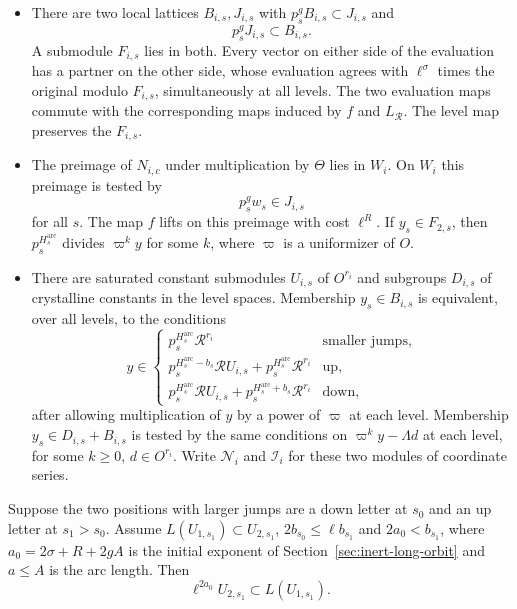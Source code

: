 \begin{itemize}
\item There are two local lattices \(B_{i,s},J_{i,s}\) with
\(p_s^g B_{i,s}\subset J_{i,s}\) and
\[
 p_s^g J_{i,s}\subset B_{i,s}.
\]
A submodule \(F_{i,s}\) lies
in both. Every vector on either side of the evaluation has a partner
on the other side, whose evaluation agrees with \(\ell^\sigma\)
times the original modulo \(F_{i,s}\), simultaneously at all
levels. The two evaluation maps commute with the corresponding
maps induced by \(f\) and \(L_{\mathcal R}\). The level map
preserves the \(F_{i,s}\).
\item The preimage of \(N_{i,c}\) under multiplication by
\(\Theta\) lies in \(W_i\). On \(W_i\) this preimage is tested
by
\[
 p_s^g w_s\in J_{i,s}
\]
for all \(s\).
The map \(f\) lifts on this preimage with cost \(\ell^R\).
If \(y_s\in F_{2,s}\), then \(p_s^{H_s^{\mathrm{arc}}}\) divides
\(\varpi^k y\) for some \(k\), where \(\varpi\) is a
uniformizer of \(O\).
\item There are saturated constant submodules \(U_{i,s}\) of
\(O^{r_i}\) and subgroups \(D_{i,s}\) of crystalline constants
in the level spaces. Membership \(y_s\in B_{i,s}\) is equivalent,
over all levels, to the conditions
\[
 y\in
 \begin{cases}
 p_s^{H_s^{\mathrm{arc}}}\mathcal R^{r_i} &\text{smaller jumps},\\
 p_s^{H_s^{\mathrm{arc}}-b_s}\mathcal R U_{i,s}+p_s^{H_s^{\mathrm{arc}}}\mathcal R^{r_i}
                          &\text{up},\\
 p_s^{H_s^{\mathrm{arc}}}\mathcal R U_{i,s}+p_s^{H_s^{\mathrm{arc}}+b_s}\mathcal R^{r_i}
                          &\text{down},
 \end{cases}
 \tag{\(*\)}\label{eq:wach-level-condition}
\]
after allowing multiplication of \(y\) by a power of \(\varpi\)
at each level. Membership \(y_s\in D_{i,s}+B_{i,s}\) is tested
by the same conditions on \(\varpi^k y-\Lambda d\) at each level,
for some \(k\ge0\), \(d\in O^{r_i}\). Write \(\mathcal N_i\)
and \(\mathcal I_i\) for these two modules of coordinate series.
\end{itemize}

\begin{lemma}\label{lem:up-after-down}
Suppose the two positions with larger jumps are a down letter
at \(s_0\) and an up letter at \(s_1>s_0\).
Assume \(L(U_{1,s_1})\subset U_{2,s_1}\),
\(2b_{s_0}\le\ell b_{s_1}\) and \(2a_0<b_{s_1}\), where
\(a_0=2\sigma+R+2gA\) is the initial exponent of
Section~\ref{sec:inert-long-orbit} and \(a\le A\) is the arc length. Then
\[
 \ell^{2a_0}U_{2,s_1}\subset L(U_{1,s_1}).
\]
\end{lemma}

